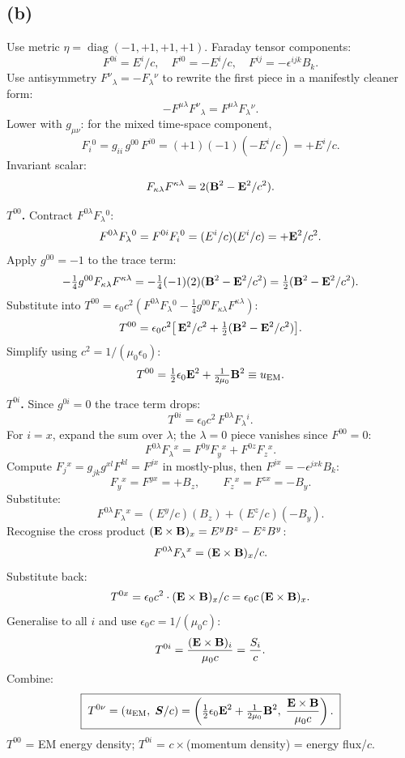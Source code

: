 \documentclass[11pt]{article}
\DeclareMathOperator{\diag}{diag}
\begin{document}

\subsection*{(b)}

Use metric $\eta=\diag(-1,+1,+1,+1)$. Faraday tensor components:
\[ F^{0i} = E^i/c,\quad F^{i0} = -E^i/c,\quad F^{ij} = -\epsilon^{ijk}B_k. \]
Use antisymmetry $F^\nu{}_\lambda = -F_\lambda{}^\nu$ to rewrite the first piece in a manifestly cleaner form:
\[ -F^{\mu\lambda}F^\nu{}_\lambda = F^{\mu\lambda}F_\lambda{}^\nu. \]
Lower with $g_{\mu\nu}$: for the mixed time-space component,
\[ F_i{}^0 = g_{ii}\,g^{00}\,F^{i0} = (+1)(-1)(-E^i/c) = +E^i/c. \]
Invariant scalar:
\[ F_{\kappa\lambda}F^{\kappa\lambda} = 2(\vb B^2 - \vb E^2/c^2). \]

\textbf{$T^{00}$.} Contract $F^{0\lambda}F_\lambda{}^0$:
\[ F^{0\lambda}F_\lambda{}^0 = F^{0i}F_i{}^0 = (E^i/c)(E^i/c) = +\vb E^2/c^2. \]
Apply $g^{00}=-1$ to the trace term:
\[ -\tfrac14 g^{00}F_{\kappa\lambda}F^{\kappa\lambda} = -\tfrac14(-1)(2)(\vb B^2-\vb E^2/c^2) = \tfrac12(\vb B^2-\vb E^2/c^2). \]
Substitute into $T^{00} = \epsilon_0 c^2(F^{0\lambda}F_\lambda{}^0 - \tfrac14 g^{00}F_{\kappa\lambda}F^{\kappa\lambda})$:
\[ T^{00} = \epsilon_0 c^2\bigl[\,\vb E^2/c^2 + \tfrac12(\vb B^2-\vb E^2/c^2)\bigr]. \]
Simplify using $c^2 = 1/(\mu_0\epsilon_0)$:
\[ T^{00} = \tfrac12\epsilon_0\vb E^2 + \tfrac{1}{2\mu_0}\vb B^2 \equiv u_{\rm EM}. \]

\textbf{$T^{0i}$.} Since $g^{0i}=0$ the trace term drops:
\[ T^{0i} = \epsilon_0 c^2\, F^{0\lambda}F_\lambda{}^i. \]
For $i=x$, expand the sum over $\lambda$; the $\lambda=0$ piece vanishes since $F^{00}=0$:
\[ F^{0\lambda}F_\lambda{}^x = F^{0y}F_y{}^x + F^{0z}F_z{}^x. \]
Compute $F_j{}^x = g_{jk}g^{xl}F^{kl} = F^{jx}$ in mostly-plus, then $F^{jx} = -\epsilon^{jxk}B_k$:
\[ F_y{}^x = F^{yx} = +B_z,\qquad F_z{}^x = F^{zx} = -B_y. \]
Substitute:
\[ F^{0\lambda}F_\lambda{}^x = (E^y/c)(B_z) + (E^z/c)(-B_y). \]
Recognise the cross product $(\vb E\times\vb B)_x = E^y B^z - E^z B^y$:
\[ F^{0\lambda}F_\lambda{}^x = (\vb E\times\vb B)_x/c. \]
Substitute back:
\[ T^{0x} = \epsilon_0 c^2\cdot (\vb E\times\vb B)_x/c = \epsilon_0 c\,(\vb E\times\vb B)_x. \]
Generalise to all $i$ and use $\epsilon_0 c = 1/(\mu_0 c)$:
\[ T^{0i} = \frac{(\vb E\times\vb B)_i}{\mu_0 c} = \frac{S_i}{c}. \]
Combine:
\begin{equation}
\boxed{\;T^{0\nu} = \left(u_{\rm EM},\;\bm S/c\right) = \left(\tfrac12\epsilon_0\vb E^2 + \tfrac{1}{2\mu_0}\vb B^2,\;\frac{\vb E\times\vb B}{\mu_0 c}\right).\;}
\label{eq:T0nu}
\end{equation}
$T^{00}$ = EM energy density; $T^{0i}$ = $c\times$(momentum density) = energy flux/$c$.
\end{document}
